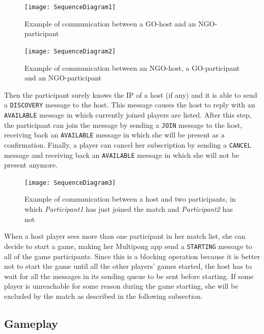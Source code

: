 \begin{figure}[h]
    \centering
    \texttt{[image: SequenceDiagram1]}
    \caption{Example of communication between a GO-host and an NGO-participant}
    \label{fig:seqDiagram1}
\end{figure}

\begin{figure}[h]
    \centering
    \texttt{[image: SequenceDiagram2]}
    \caption{Example of communication between an NGO-host, a GO-participant
     and an NGO-participant}
    \label{fig:seqDiagram2}
\end{figure}

Then the participant surely knows the IP of a host (if any) and it is able to
send a \texttt{DISCOVERY} message to the host. This message causes the host to
reply with an \texttt{AVAILABLE} message in which currently joined players are
listed. After this step, the participant can join the message by sending a
\texttt{JOIN} message to the host, receiving back an \texttt{AVAILABLE} message
in which she will be present as a confirmation. Finally, a player can cancel
her subscription by sending a \texttt{CANCEL} message and receiving back an
\texttt{AVAILABLE} message in which she will not be present anymore.

\begin{figure}[h]
    \centering
    \texttt{[image: SequenceDiagram3]}
    \caption{Example of communication between a host and two participants,
     in which \emph{Participant1} has just joined the match and
     \emph{Participant2} has not}
    \label{fig:seqDiagram3}
\end{figure}

When a host player sees more than one participant in her match list, she can
decide to start a game, making her Multipong app send a \texttt{STARTING}
message to all of the game participants. Since this is a blocking operation
because it is better not to start the game until all the other players' games
started, the host has to wait for all the messages in its sending queue to be
sent before starting. If some player is unreachable for some reason
during the game starting, she will be excluded by the match as described in
the following subsection.



\subsection{Gameplay}



